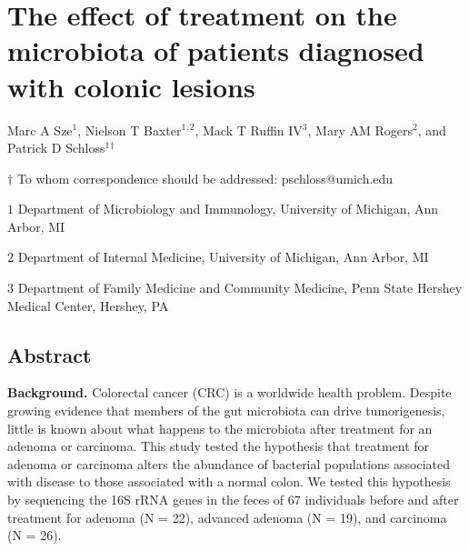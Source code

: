 \documentclass[12pt,]{article}
\title{}
\author{}
\date{}
\begin{document}
\section{The effect of treatment on the microbiota of patients diagnosed
with colonic
lesions}\label{the-effect-of-treatment-on-the-microbiota-of-patients-diagnosed-with-colonic-lesions}

\begin{center}
\vspace{25mm}

Marc A Sze${^1}$, Nielson T Baxter${^1}$${^,}$${^2}$, Mack T Ruffin IV${^3}$, Mary AM Rogers${^2}$, and Patrick D Schloss${^1}$${^\dagger}$

\vspace{20mm}

$\dagger$ To whom correspondence should be addressed: pschloss@umich.edu

$1$ Department of Microbiology and Immunology, University of Michigan, Ann Arbor, MI

$2$ Department of Internal Medicine, University of Michigan, Ann Arbor, MI

$3$ Department of Family Medicine and Community Medicine, Penn State Hershey Medical Center, Hershey, PA


\end{center}

\newpage

\linenumbers

\subsection{Abstract}\label{abstract}

\textbf{Background.} Colorectal cancer (CRC) is a worldwide health
problem. Despite growing evidence that members of the gut microbiota can
drive tumorigenesis, little is known about what happens to the
microbiota after treatment for an adenoma or carcinoma. This study
tested the hypothesis that treatment for adenoma or carcinoma alters the
abundance of bacterial populations associated with disease to those
associated with a normal colon. We tested this hypothesis by sequencing
the 16S rRNA genes in the feces of 67 individuals before and after
treatment for adenoma (N = 22), advanced adenoma (N = 19), and carcinoma
(N = 26).
\end{document}
